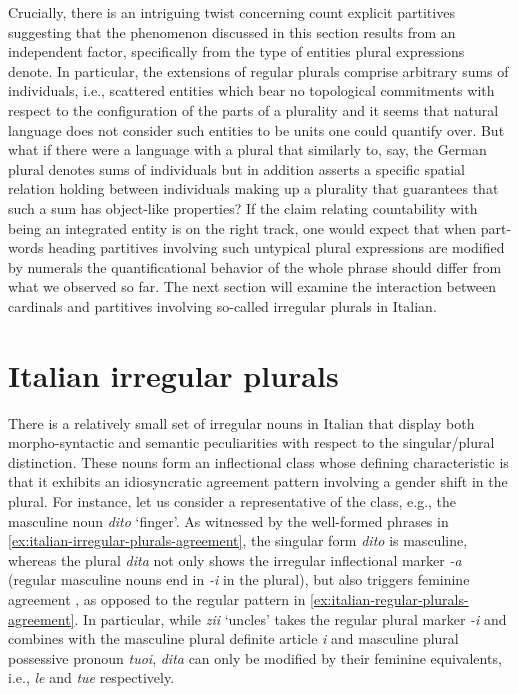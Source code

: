 Crucially, there is an intriguing twist concerning count explicit partitives suggesting that the phenomenon discussed in this section results from an independent factor, specifically from the type of entities plural expressions denote. In particular, the extensions of regular plurals comprise arbitrary sums of individuals, i.e., scattered entities which bear no topological commitments with respect to the configuration of the parts of a plurality and it seems that natural language does not consider such entities to be units one could quantify over. But what if there were a language with a plural that similarly to, say, the German plural denotes sums of individuals but in addition asserts a specific spatial relation holding between individuals making up a plurality that guarantees that such a sum has object-like properties? If the claim relating countability with being an integrated entity is on the right track, one would expect that when part-words heading partitives involving such untypical plural expressions are modified by numerals the quantificational behavior of the whole phrase should differ from what we observed so far. The next section will examine the interaction between cardinals and partitives involving so-called irregular plurals in Italian. 

\section{Italian irregular plurals}\label{sec:italian-irregular-plurals}
		
There is a relatively small set of irregular nouns in Italian that display both morpho-syntactic and semantic peculiarities with respect to the singular/plural distinction. These nouns form an inflectional class whose defining characteristic is that it exhibits an idiosyncratic agreement pattern involving a gender shift in the plural. For instance, let us consider a representative of the class, e.g., the masculine noun \textit{dito} `finger'. As witnessed by the well-formed phrases in \ref{ex:italian-irregular-plurals-agreement}, the singular form \textit{dito} is masculine, whereas the plural \textit{dita} not only shows the irregular inflectional marker \textit{-a} (regular masculine nouns end in \textit{-i} in the plural), but also triggers feminine agreement \citep[p. 125]{acquaviva2008lexical}, as opposed to the regular pattern in \ref{ex:italian-regular-plurals-agreement}. In particular, while \textit{zii} `uncles' takes the regular plural marker \textit{-i} and combines with the masculine plural definite article \textit{i} and masculine plural possessive pronoun \textit{tuoi}, \textit{dita} can only be modified by their feminine equivalents, i.e., \textit{le} and \textit{tue} respectively.
	
